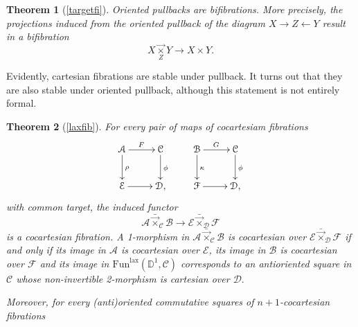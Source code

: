 \documentclass[10pt,oneside]{article}
\numberwithin{equation}{section} %
\numberwithin{figure}{section} %
\theoremstyle{plain}
\newtheorem{theorem}{Theorem}[subsection]
\theoremstyle{definition}
\newcommand{\bD}{{\mathbb D}}
\newcommand{\mA}{{\mathcal A}}
\newcommand{\mB}{{\mathcal B}}
\newcommand{\mC}{{\mathcal C}}
\newcommand{\mD}{{\mathcal D}}
\newcommand{\mE}{{\mathcal E}}
\newcommand{\mF}{{\mathcal F}}
\newcommand{\Fun}{\mathrm{Fun}}
\newcommand{\lax}{{\mathrm{lax}}}
\begin{document}
\begin{theorem}[{\cref{targetfi}}]
    Oriented pullbacks are bifibrations.
    More precisely, the projections induced from the oriented pullback of the diagram $X\to Z\leftarrow Y$ result in a bifibration
\[
X\underset{Z}{\vec{\times}}Y\to X\times Y.
\]
\end{theorem}

Evidently, cartesian fibrations are stable under pullback.
It turns out that they are also stable under oriented pullback, although this statement is not entirely formal.
\begin{theorem}[{\cref{laxfib}}]
For every pair of maps of cocartesiam fibrations
\begin{equation*}
\xymatrix{
\mA \ar[r]^F \ar[d]^\rho & \mC \ar[d]^\phi \\
\mE \ar[r] & \mD,
}\qquad
\xymatrix{
\mB \ar[r]^G \ar[d]^\kappa & \mC \ar[d]^\phi \\
\mF \ar[r] & \mD,
}
\end{equation*}
with common target, the induced functor 
\begin{equation*}
\mA {\bar{\vec{\times}}}_{\mC} \mB \to \mE {\bar{\vec{\times}}}_{\mD} \mF
\end{equation*}
is a cocartesian fibration.
A 1-morphism in $\mA {\bar{\vec{\times}}}_{\mC} \mB $ is cocartesian over $\mE {\bar{\vec{\times}}}_{\mD} \mF $ if and only if its image in $\mA$ is cocartesian over $\mE$, its image in $\mB$ is cocartesian over $\mF$ and its image in $\Fun^\lax(\bD^1,\mC)$
corresponds to an antioriented square in $\mC$ whose non-invertible 2-morphism is cartesian over $\mD.$

Moreover, for every (anti)oriented commutative squares of $n+1$-cocartesian fibrations 


\end{theorem}
\end{document}

